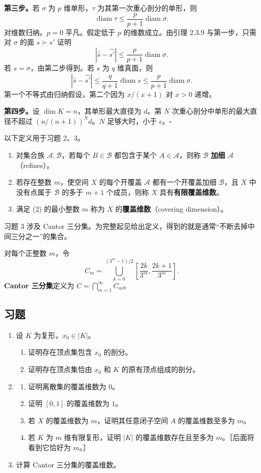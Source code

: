 \textbf{第三步。}若 $\sigma$ 为 $p$ 维单形，$\tau$ 为其第一次重心剖分的单形，则
\[
\operatorname{diam}\tau\leq\frac p{p+1}\operatorname{diam}\sigma.
\]
对维数归纳。$p=0$ 平凡。假定低于 $p$ 的维数成立。由引理 2.3.9 与第一步，只需对 $\sigma$ 的面 $s\succ s'$ 证明
\[
|\widehat s-\widehat{s'}|\leq\frac p{p+1}\operatorname{diam}\sigma.
\]
若 $s=\sigma$，由第二步得到。若 $s$ 为 $q$ 维真面，则
\[
|\widehat s-\widehat{s'}|\leq\frac q{q+1}\operatorname{diam}s
\leq\frac p{p+1}\operatorname{diam}\sigma.
\]
第一个不等式由归纳假设，第二个因为 $x/(x+1)$ 对 $x>0$ 递增。

\textbf{第四步。}设 $\dim K=n$，其单形最大直径为 $d$。第 $N$ 次重心剖分中单形的最大直径不超过 $(n/(n+1))^Nd$。$N$ 足够大时，小于 $\epsilon$。\hfill$\square$

以下定义用于习题 2、3。

\begin{enumerate}[label=(\arabic*)]
\item 对集合族 $\mathcal A,\mathcal B$，若每个 $B\in\mathcal B$ 都包含于某个 $A\in\mathcal A$，则称 $\mathcal B$ \textbf{加细} $\mathcal A$（refines）。
\item 若存在整数 $m$，使空间 $X$ 的每个开覆盖 $\mathcal A$ 都有一个开覆盖加细 $\mathcal B$，且 $X$ 中没有点属于 $\mathcal B$ 的多于 $m+1$ 个成员，则称 $X$ 具有\textbf{有限覆盖维数}。
\item 满足 (2) 的最小整数 $m$ 称为 $X$ 的\textbf{覆盖维数}（covering dimension）。
\end{enumerate}
习题 3 涉及 Cantor 三分集。为完整起见给出定义，得到的就是通常“不断去掉中间三分之一”的集合。

对每个正整数 $m$，令
\[
C_m=\bigcup_{k=0}^{(3^m-1)/2}\left[\frac{2k}{3^m},\frac{2k+1}{3^m}\right].
\]
\textbf{Cantor 三分集}定义为 $C=\bigcap_{m=1}^\infty C_m$。

\subsection*{习题}
\begin{enumerate}
\item 设 $K$ 为复形，$x_0\in|K|$。
\begin{enumerate}[label=(\alph*)]
\item 证明存在顶点集包含 $x_0$ 的剖分。
\item[\textasteriskcentered\,(b)] 证明存在顶点集恰由 $x_0$ 和 $K$ 的原有顶点组成的剖分。
\end{enumerate}
\item \begin{enumerate}[label=(\alph*)]
\item 证明离散集的覆盖维数为 $0$。
\item 证明 $[0,1]$ 的覆盖维数为 $1$。
\item 若 $X$ 的覆盖维数为 $m$，证明其任意闭子空间 $A$ 的覆盖维数至多为 $m$。
\item 若 $K$ 为 $m$ 维有限复形，证明 $|K|$ 的覆盖维数存在且至多为 $m$。［后面将看到它恰好为 $m$。］
\end{enumerate}
\item 计算 Cantor 三分集的覆盖维数。
\end{enumerate}

